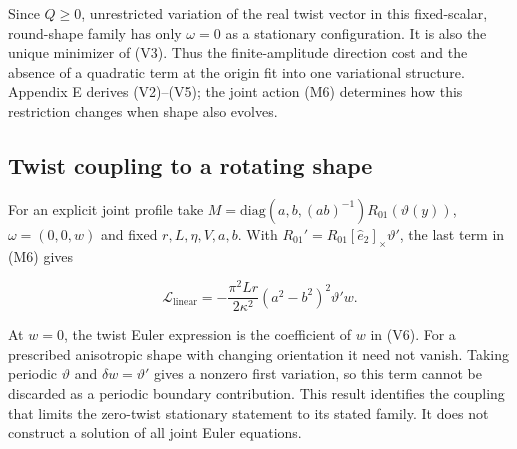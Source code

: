 Since $Q\ge0$, unrestricted variation of the real twist vector in this fixed-scalar, round-shape family has only $\omega=0$ as a stationary configuration. It is also the unique minimizer of (V3). Thus the finite-amplitude direction cost and the absence of a quadratic term at the origin fit into one variational structure. Appendix E derives (V2)--(V5); the joint action (M6) determines how this restriction changes when shape also evolves.

\subsection{Twist coupling to a rotating shape}

For an explicit joint profile take $M=\mathrm{diag}(a,b,(ab)^{-1})R_{01}(\vartheta(y))$, $\omega=(0,0,w)$ and fixed $r,L,\eta,V,a,b$. With $R_{01}'=R_{01}[\hat e_2]_\times\vartheta'$, the last term in (M6) gives

\begin{equation}\tag{V6}\label{eq:V6}
\mathcal L_{\mathrm{linear}}
=-\frac{\pi^2Lr}{2\kappa^2}(a^2-b^2)^2\vartheta' w.
\end{equation}

At $w=0$, the twist Euler expression is the coefficient of $w$ in (V6). For a prescribed anisotropic shape with changing orientation it need not vanish. Taking periodic $\vartheta$ and $\delta w=\vartheta'$ gives a nonzero first variation, so this term cannot be discarded as a periodic boundary contribution. This result identifies the coupling that limits the zero-twist stationary statement to its stated family. It does not construct a solution of all joint Euler equations.

